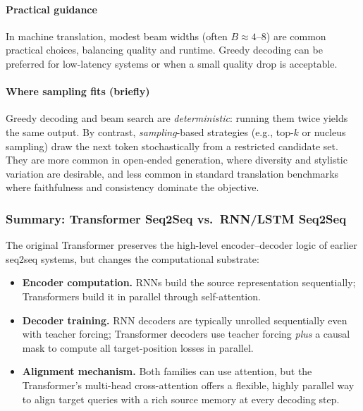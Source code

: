 \paragraph{Practical guidance}
\noindent
In machine translation,
modest beam widths (often \(B \approx 4\text{--}8\))
are common practical choices,
balancing quality and runtime.
Greedy decoding can be preferred for low-latency systems
or when a small quality drop is acceptable.

\paragraph{Where sampling fits (briefly)}
\noindent
Greedy decoding and beam search are \emph{deterministic}:
running them twice yields the same output.
By contrast,
\emph{sampling}-based strategies (e.g., top-\(k\) or nucleus sampling)
draw the next token stochastically from a restricted candidate set.
They are more common in open-ended generation,
where diversity and stylistic variation are desirable,
and less common in standard translation benchmarks
where faithfulness and consistency dominate the objective.

\subsubsection{Summary: Transformer Seq2Seq vs.\ RNN/LSTM Seq2Seq}
\label{subsubsec:chapter17_seq2seq_summary_transformer_vs_rnn}

\noindent
The original Transformer preserves the high-level encoder--decoder logic of earlier seq2seq systems,
but changes the computational substrate:

\begin{itemize}
	\item \textbf{Encoder computation.}
	RNNs build the source representation sequentially;
	Transformers build it in parallel through self-attention.
	
	\item \textbf{Decoder training.}
	RNN decoders are typically unrolled sequentially even with teacher forcing;
	Transformer decoders use teacher forcing \emph{plus} a causal mask
	to compute all target-position losses in parallel.
	
	\item \textbf{Alignment mechanism.}
	Both families can use attention,
	but the Transformer's multi-head cross-attention offers a flexible, highly parallel way
	to align target queries with a rich source memory at every decoding step.
\end{itemize}

